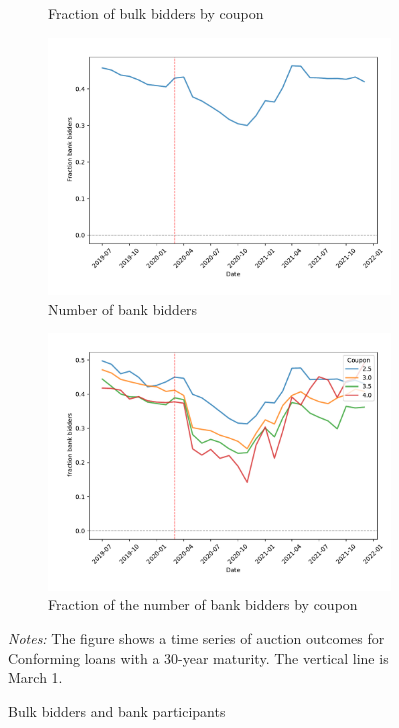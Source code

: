 \documentclass[11pt,a4paper]{article}
\begin{document}
\begin{figure}[h]
\begin{subfigure}[b]{0.49\textwidth}
      \caption{ Fraction of bulk bidders by coupon}
     \end{subfigure}
     \begin{subfigure}[b]{0.49\textwidth}
      \includegraphics[width=0.998\textwidth]{../results/figures/fraction_banks_mean_mat30_loan1_timeseries_nrmonthly_2.5_4_.pdf}
      \caption{  Number of bank bidders}
     \end{subfigure}
       \begin{subfigure}[b]{0.49\textwidth}
        \includegraphics[width=0.998\textwidth]{../results/figures/fraction_banks_mean_mat30_loan1_timeseries_cpmonthly_2.5_4_.pdf}
        \caption{ Fraction of the number of bank bidders by coupon}
       \end{subfigure}
     \caption{Bulk bidders and bank participants} 
   \begin{minipage}{\textwidth}
      \footnotesize{\textit{Notes:} The figure shows a time series of auction outcomes for Conforming loans with a 30-year maturity. The vertical line is March 1.  } 
      \end{minipage}
\end{figure}
\end{document}
